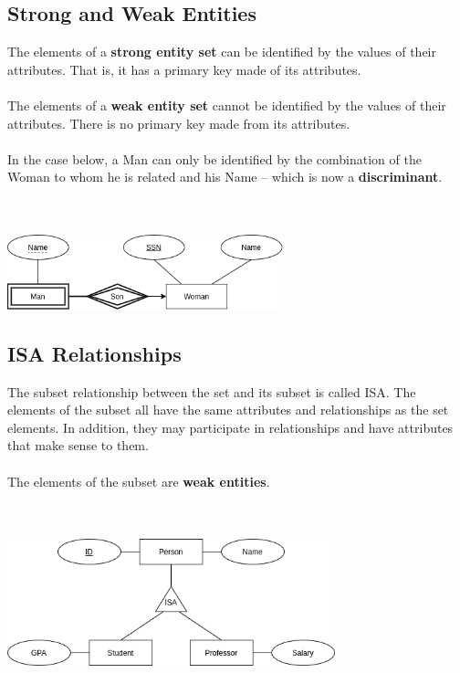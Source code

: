 \documentclass{article}
\begin{document}
\subsection{Strong and Weak Entities}
The elements of a \textbf{strong entity set} can be identified by the values of their attributes. That is, it has a primary key made of its attributes. \\ \\
The elements of a \textbf{weak entity set} cannot be identified by the values of their attributes. There is no primary key made from its attributes. \\ \\
In the case below, a Man can only be identified by the combination of the Woman to whom he is related and his Name -- which is now a \textbf{discriminant}. \\ \\ \\

\centerline{\includegraphics[width=8cm]{./assets/weak.png}}
\vspace{.6cm}

\subsection{ISA Relationships}
The subset relationship between the set and its subset is called ISA. The elements of the subset all have the same attributes and relationships as the set elements. In addition, they may participate in relationships and have attributes that make sense to them. \\ \\
The elements of the subset are \textbf{weak entities}. \\ \\ \\

\centerline{\includegraphics[width=9.5cm]{./assets/isa.png}}
\vspace{.6cm}
\end{document}
